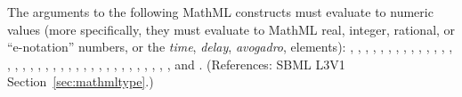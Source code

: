 \removedRule
  {The arguments to the following MathML constructs must evaluate to numeric
values (more specifically, they must evaluate to MathML real, integer,
rational, or ``e-notation'' numbers, or the \emph{time}, \emph{delay},
\emph{avogadro},  elements): , ,
, , , ,
, , , ,
, , , ,
, , , , ,
, , , , ,
, , , , ,
, , , , ,
, , and .}
  {(References: SBML L3V1 Section~\ref{sec:mathmltype}.)}
